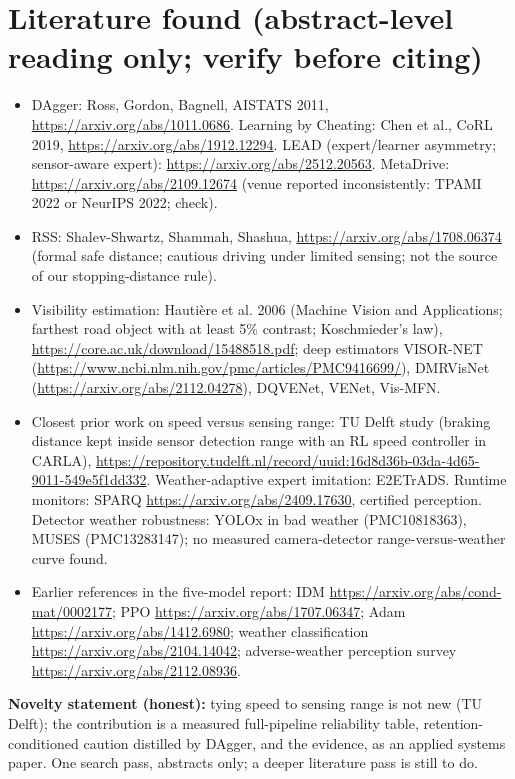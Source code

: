 \documentclass[10.5pt,a4paper]{article}
\begin{document}
\section{Literature found (abstract-level reading only; verify before citing)}
\begin{itemize}[leftmargin=*]
\item DAgger: Ross, Gordon, Bagnell, AISTATS 2011, \url{https://arxiv.org/abs/1011.0686}. Learning by Cheating: Chen et al., CoRL 2019, \url{https://arxiv.org/abs/1912.12294}. LEAD (expert/learner asymmetry; sensor-aware expert): \url{https://arxiv.org/abs/2512.20563}. MetaDrive: \url{https://arxiv.org/abs/2109.12674} (venue reported inconsistently: TPAMI 2022 or NeurIPS 2022; check).
\item RSS: Shalev-Shwartz, Shammah, Shashua, \url{https://arxiv.org/abs/1708.06374} (formal safe distance; cautious driving under limited sensing; not the source of our stopping-distance rule).
\item Visibility estimation: Hautière et al. 2006 (Machine Vision and Applications; farthest road object with at least 5\% contrast; Koschmieder's law), \url{https://core.ac.uk/download/15488518.pdf}; deep estimators VISOR-NET (\url{https://www.ncbi.nlm.nih.gov/pmc/articles/PMC9416699/}), DMRVisNet (\url{https://arxiv.org/abs/2112.04278}), DQVENet, VENet, Vis-MFN.
\item Closest prior work on speed versus sensing range: TU Delft study (braking distance kept inside sensor detection range with an RL speed controller in CARLA), \url{https://repository.tudelft.nl/record/uuid:16d8d36b-03da-4d65-9011-549e5f1dd332}. Weather-adaptive expert imitation: E2ETrADS. Runtime monitors: SPARQ \url{https://arxiv.org/abs/2409.17630}, certified perception. Detector weather robustness: YOLOx in bad weather (PMC10818363), MUSES (PMC13283147); no measured camera-detector range-versus-weather curve found.
\item Earlier references in the five-model report: IDM \url{https://arxiv.org/abs/cond-mat/0002177}; PPO \url{https://arxiv.org/abs/1707.06347}; Adam \url{https://arxiv.org/abs/1412.6980}; weather classification \url{https://arxiv.org/abs/2104.14042}; adverse-weather perception survey \url{https://arxiv.org/abs/2112.08936}.
\end{itemize}
\textbf{Novelty statement (honest):} tying speed to sensing range is not new (TU Delft); the contribution is a measured full-pipeline reliability table, retention-conditioned caution distilled by DAgger, and the evidence, as an applied systems paper. One search pass, abstracts only; a deeper literature pass is still to do.
\end{document}
